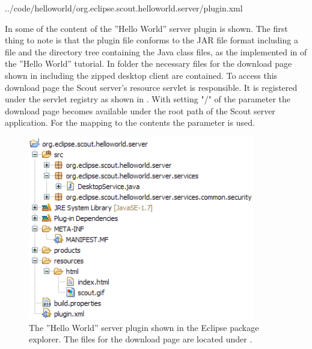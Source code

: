 \documentclass[a4paper,10pt,twoside]{book}
\begin{document}
{
{../code/helloworld/org.eclipse.scout.helloworld.server/plugin.xml}

In  some of the content of the ''Hello World'' server plugin is shown.
The first thing to note is that the plugin file conforms to the JAR file format including a  file and the directory tree containing the Java class files, as the  implemented in  of the ''Hello World'' tutorial.
In folder  the necessary files for the download page shown in  including the zipped desktop client are contained.
To access this download page the Scout server's resource servlet  is responsible.
It is registered under the servlet registry as shown in .
With setting "/" of the  parameter the download page becomes available under the root path of the Scout server application.
For the mapping to the contents  the parameter  is used.

\begin{figure}
\includegraphics[height=8cm]{helloworld_server_plugin.png} 
\caption{The ''Hello World'' server plugin shown in the Eclipse package explorer.
The files for the download page are located under .} 
\end{figure}

}
\end{document}
